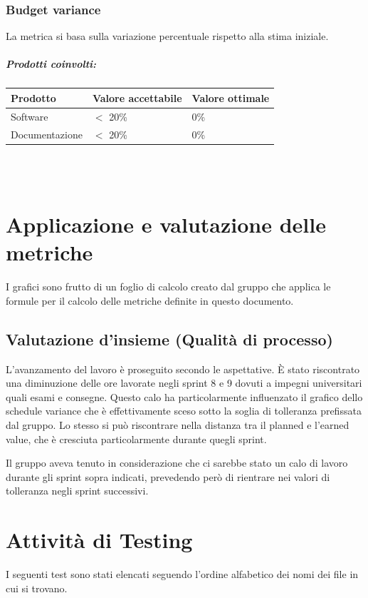 \documentclass[a4paper, 12pt]{article}
\begin{document}
\subsubsection{Budget variance}
La metrica si basa sulla variazione percentuale rispetto alla stima iniziale.

\subparagraph{Prodotti coinvolti:}
\begin{center}
	\begin{tabularx}{\textwidth}{|X|X|X|}
		\hline
		\textbf{Prodotto} & \textbf{Valore accettabile } & \textbf{Valore ottimale } \\
		\hline
		Software          & $<$ 20\%                     & 0\%                       \\
		\hline
		Documentazione    & $<$ 20\%                     & 0\%                       \\
		\hline
	\end{tabularx}\\[8pt]
	\mbox{}\\
\end{center}

\section {Applicazione e valutazione delle metriche}
I grafici sono frutto di un foglio di calcolo creato dal gruppo che applica le formule per il calcolo delle metriche definite in questo documento.
\subsection{Valutazione d’insieme (Qualità di processo)}
L'avanzamento del lavoro è proseguito secondo le aspettative.
È stato riscontrato una diminuzione delle ore lavorate negli sprint 8 e 9 dovuti 
a impegni universitari quali esami e consegne. 
Questo calo ha particolarmente 
influenzato il grafico dello schedule variance che è effettivamente sceso sotto la soglia di tolleranza prefissata dal gruppo. 
Lo stesso si può riscontrare nella distanza tra il planned e l’earned value, che 
è cresciuta particolarmente durante quegli sprint. 

Il gruppo aveva tenuto in considerazione che ci sarebbe stato un calo di lavoro durante gli sprint sopra indicati, prevedendo però di rientrare nei valori di tolleranza negli sprint successivi.



\section{Attività di Testing}
I seguenti test sono stati elencati seguendo l'ordine alfabetico dei nomi dei file in cui si trovano.
\end{document}
